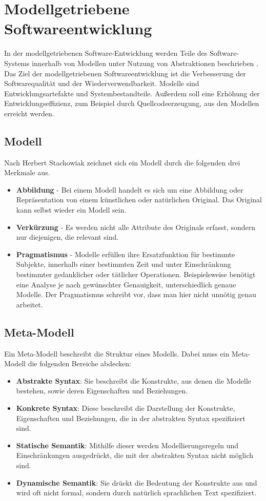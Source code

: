 \section{Modellgetriebene Softwareentwicklung}
\label{sec:mdsd}
In der modellgetriebenen Software-Entwicklung werden Teile des Software-Systems innerhalb von Modellen unter Nutzung von Abstraktionen beschrieben \cite{MDSD}. Das Ziel der modellgetriebenen Softwareentwicklung ist die Verbesserung der Softwarequalität und der Wiederverwendbarkeit. Modelle sind Entwicklungsartefakte und Systembestandteile. Außerdem soll eine Erhöhung der Entwicklungseffizienz, zum Beispiel durch Quellcodeerzeugung, aus den Modellen erreicht werden.

\subsection{Modell}
Nach Herbert Stachowiak \cite{Stachowiak1973} zeichnet sich ein Modell durch die folgenden drei Merkmale aus.
\begin{itemize}
\item \textbf{Abbildung} - Bei einem Modell handelt es sich um eine Abbildung oder Repräsentation von einem künstlichen oder natürlichen Original. Das Original kann selbst wieder ein Modell sein. 
\item \textbf{Verkürzung} - Es werden nicht alle Attribute des Originals erfasst, sondern nur diejenigen, die relevant sind.
\item \textbf{Pragmatismus} - Modelle erfüllen ihre Ersatzfunktion für bestimmte Subjekte, innerhalb einer bestimmten Zeit und unter Einschränkung bestimmter gedanklicher oder tätlicher Operationen. Beispielsweise benötigt eine Analyse je nach gewünschter Genauigkeit, unterschiedlich genaue Modelle. Der Pragmatismus schreibt vor, dass man hier nicht unnötig genau arbeitet.
\end{itemize} 
\subsection{Meta-Modell}
Ein Meta-Modell beschreibt die Struktur eines Modells. Dabei muss ein Meta-Modell die folgenden Bereiche abdecken:
\begin{itemize}
\item \textbf{Abstrakte Syntax}: Sie beschreibt die Konstrukte, aus denen die Modelle bestehen, sowie deren Eigenschaften und Beziehungen.
\item \textbf{Konkrete Syntax}: Diese beschreibt die Darstellung der Konstrukte, Eigenschaften und Beziehungen, die in der abstrakten Syntax spezifiziert sind.
\item \textbf{Statische Semantik}: Mithilfe dieser werden Modellierungsregeln und Einschränkungen ausgedrückt, die mit der abstrakten Syntax nicht möglich sind.
\item \textbf{Dynamische Semantik}: Sie drückt die Bedeutung der Konstrukte aus und wird oft nicht formal, sondern durch natürlich sprachlichen Text spezifiziert.
\end{itemize}

